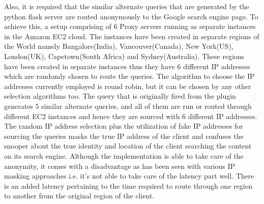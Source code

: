 \documentclass[10pt, a4paper, twocolumn]{article} %
\begin{document}
Also, it is required that the similar alternate queries that are generated by the python flask server are routed anonymously to the Google search engine page. To achieve this, a setup comprising of 6 Proxy servers running as separate instances in the Amazon EC2 cloud. The instances have been created in separate regions of the World namely Bangalore(India), Vancouver(Canada), New York(US), London(UK), Capetown(South Africa) and Sydney(Australia). These regions have been created in separate instances thus they have 6 different IP addresses which are randomly chosen to route the queries. The algorithm to choose the IP addresses currently employed is round robin, but it can be chosen by any other selection algorithms too.\newline
The query that is originally fired from the plugin generates 5 similar alternate queries, and all of them are run or routed through different EC2 instances and hence they are sourced with 6 different IP addresses. The random IP address selection plus the utilization of fake IP addresses for sourcing the queries masks the true IP address of the client and confuses the snooper about the true identity and location of the client searching the content on its search engine. Although the implementation is able to take care of the anonymity, it comes with a disadvantage as has been seen with various IP masking approaches i.e. it's not able to take care of the latency part well. There is an added latency pertaining to the time required to route through one region to another from the original region of the client.
\end{document}
